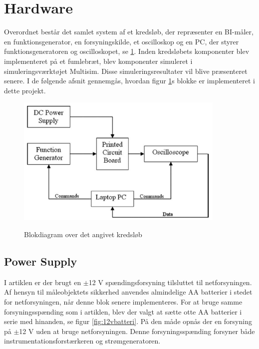 \section{Hardware}

Overordnet består det samlet system af et kredsløb, der repræsenter en BI-måler, en funktionsgenerator, en forsyningskilde, et oscilloskop og en PC, der styrer funktionsgeneratoren og oscilloskopet, se \ref{fig:oprindeligebd}. Inden kredsløbets komponenter blev implementeret på et fumlebræt, blev komponenter simuleret i simuleringsværktøjet Multisim. Disse simuleringsresultater vil blive præsenteret senere. I de følgende afsnit gennemgås, hvordan figur  \ref{fig:oprindeligebd}s blokke er implementeret i dette projekt. 

\begin{figure}[H]
\centering
{\includegraphics[width=10cm]
{Figure/oprindeligebd}}
\caption{Blokdiagram over det angivet kredsløb \cite{Aroom2009}}
\label{fig:oprindeligebd}
\end{figure}

\pagebreak

\subsection{Power Supply}
I artiklen er der brugt en $\pm$12 V spændingsforsyning tilsluttet til netforsyningen. Af hensyn til måleobjektets sikkerhed anvendes almindelige AA batterier i stedet for netforsyningen, når denne blok senere implementeres. For at bruge samme forsyningsspænding som i artiklen, blev der valgt at sætte otte AA batterier i serie med hinanden, se figur \ref{fig:12vbatteri}. På den måde opnås der en forsyning på $\pm$12 V uden at bruge netforsyningen. Denne forsyningsspænding forsyner både instrumentationsforstærkeren og strømgeneratoren. 

